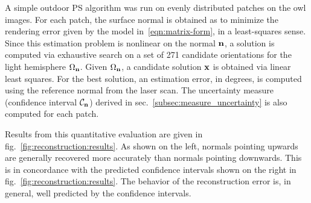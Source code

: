 A simple outdoor PS algorithm was run on evenly distributed patches on the owl images. For each patch, the surface normal is obtained as to minimize the rendering error given by the model in~\eqref{eqn:matrix-form}, in a least-squares sense. Since this estimation problem is nonlinear on the normal ${\bf n}$, a solution is computed via exhaustive search on a set of 271 candidate orientations for the light hemisphere $\Omega_{\bf n}$. Given $\Omega_{\bf n}$, a candidate solution ${\bf x}$ is obtained via linear least squares. For the best solution, an estimation error, in degrees, is computed using the reference normal from the laser scan. The uncertainty measure (confidence interval $\mathcal{C}_{\bf n}$) derived in sec.~\ref{subsec:measure_uncertainty} is also computed for each patch.

Results from this quantitative evaluation are given in fig.~\ref{fig:reconstruction:results}. As shown on the left, normals pointing upwards are generally recovered more accurately than normals pointing downwards. This is in concordance with the predicted confidence intervals shown on the right in fig.~\ref{fig:reconstruction:results}. The behavior of the reconstruction error is, in general, well predicted by the confidence intervals.


